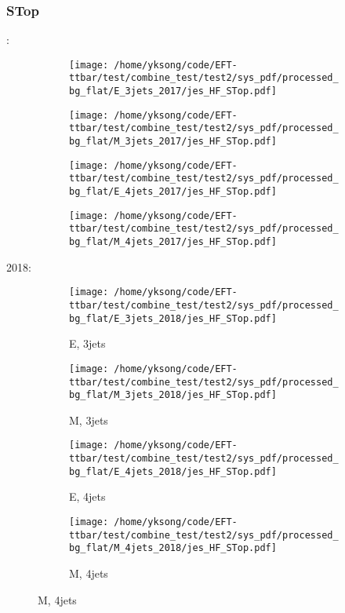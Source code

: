 \documentclass{beamer}
\begin{document}
\begin{frame}
\frametitle{STop}
\fontsize{5}{1}:
\begin{figure}
\centering
\begin{subfigure}[b]{0.24\textwidth}
\texttt{[image: /home/yksong/code/EFT-ttbar/test/combine\_test/test2/sys\_pdf/processed\_bg\_flat/E\_3jets\_2017/jes\_HF\_STop.pdf]}
\end{subfigure}
\begin{subfigure}[b]{0.24\textwidth}
\texttt{[image: /home/yksong/code/EFT-ttbar/test/combine\_test/test2/sys\_pdf/processed\_bg\_flat/M\_3jets\_2017/jes\_HF\_STop.pdf]}
\end{subfigure}
\begin{subfigure}[b]{0.24\textwidth}
\texttt{[image: /home/yksong/code/EFT-ttbar/test/combine\_test/test2/sys\_pdf/processed\_bg\_flat/E\_4jets\_2017/jes\_HF\_STop.pdf]}
\end{subfigure}
\begin{subfigure}[b]{0.24\textwidth}
\texttt{[image: /home/yksong/code/EFT-ttbar/test/combine\_test/test2/sys\_pdf/processed\_bg\_flat/M\_4jets\_2017/jes\_HF\_STop.pdf]}
\end{subfigure}
\end{figure}
2018:
\begin{figure}
\centering
\begin{subfigure}[b]{0.24\textwidth}
\texttt{[image: /home/yksong/code/EFT-ttbar/test/combine\_test/test2/sys\_pdf/processed\_bg\_flat/E\_3jets\_2018/jes\_HF\_STop.pdf]}
\captionsetup{font=tiny}
\caption{E, 3jets}
\end{subfigure}
\begin{subfigure}[b]{0.24\textwidth}
\texttt{[image: /home/yksong/code/EFT-ttbar/test/combine\_test/test2/sys\_pdf/processed\_bg\_flat/M\_3jets\_2018/jes\_HF\_STop.pdf]}
\captionsetup{font=tiny}
\caption{M, 3jets}
\end{subfigure}
\begin{subfigure}[b]{0.24\textwidth}
\texttt{[image: /home/yksong/code/EFT-ttbar/test/combine\_test/test2/sys\_pdf/processed\_bg\_flat/E\_4jets\_2018/jes\_HF\_STop.pdf]}
\captionsetup{font=tiny}
\caption{E, 4jets}
\end{subfigure}
\begin{subfigure}[b]{0.24\textwidth}
\texttt{[image: /home/yksong/code/EFT-ttbar/test/combine\_test/test2/sys\_pdf/processed\_bg\_flat/M\_4jets\_2018/jes\_HF\_STop.pdf]}
\captionsetup{font=tiny}
\caption{M, 4jets}
\end{subfigure}
\end{figure}
\end{frame}
\end{document}
